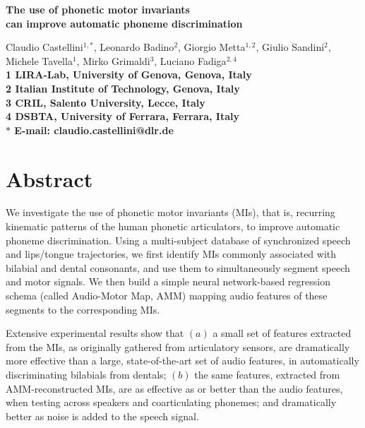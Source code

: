 \documentclass[10pt]{article}
\date{}
\begin{document}
\begin{flushleft}
{\Large
\textbf{The use of phonetic motor invariants\\
can improve automatic phoneme discrimination}
}



Claudio Castellini$^{1,\ast}$,
Leonardo Badino$^{2}$,
Giorgio Metta$^{1,2}$,
Giulio Sandini$^{2}$,
Michele Tavella$^{1}$,
Mirko Grimaldi$^{3}$,
Luciano Fadiga$^{2,4}$
\\ 
\bf{1} LIRA-Lab, University of Genova, Genova, Italy
\\
\bf{2} Italian Institute of Technology, Genova, Italy
\\
\bf{3} CRIL, Salento University, Lecce, Italy
\\
\bf{4} DSBTA, University of Ferrara, Ferrara, Italy
\\
$\ast$ E-mail: claudio.castellini@dlr.de
\end{flushleft}

\section*{Abstract}

 We investigate the use of phonetic motor invariants (MIs),
  that is, recurring kinematic patterns of the human phonetic articulators,
  to improve automatic phoneme discrimination. Using a multi-subject
  database of synchronized speech and lips/tongue trajectories, we first
  identify MIs commonly associated with bilabial and dental consonants,
  and use them to simultaneously segment speech and motor signals.
  We then build a simple neural network-based regression schema (called Audio-Motor
  Map, AMM) mapping audio features of these segments to the corresponding
  MIs.
  
  Extensive experimental results show that
  $(a)$ a small set of features extracted from the MIs, as originally gathered from
    articulatory sensors, are dramatically more effective than a large, state-of-the-art
    set of audio features, in automatically discriminating bilabials from dentals;
  $(b)$ the same features, extracted from AMM-reconstructed MIs, are as effective as
  or better than the audio features, when testing across speakers and coarticulating phonemes;
    and dramatically better as noise is added to the speech signal.
  
\end{document}
